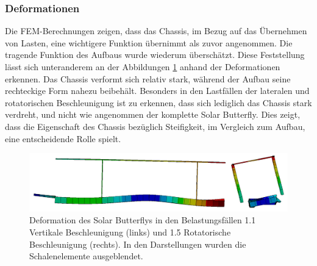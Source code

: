 \subsubsection{Deformationen}
\label{Deformation}
Die FEM-Berechnungen zeigen, dass das Chassis, im Bezug auf das Übernehmen von Lasten, eine wichtigere Funktion übernimmt als zuvor angenommen. Die tragende Funktion des Aufbaus wurde wiederum überschätzt. Diese Feststellung lässt sich unteranderem an der Abbildungen \ref{Def3} anhand der Deformationen erkennen. Das Chassis verformt sich relativ stark, während der Aufbau seine rechteckige Form nahezu beibehält. Besonders in den Lastfällen der lateralen und rotatorischen Beschleunigung ist zu erkennen, dass sich lediglich das Chassis stark verdreht, und nicht wie angenommen der komplette Solar Butterfly. Dies zeigt, dass die Eigenschaft des Chassis bezüglich Steifigkeit, im Vergleich zum Aufbau, eine entscheidende Rolle spielt. \\

\begin{figure}[H]
  \centering
  \includegraphics[width=.98\linewidth]{04_figures/Def3.png}
  \caption{Deformation des Solar Butterflys in den Belastungsfällen 1.1 Vertikale Beschleunigung (links) und 1.5 Rotatorische Beschleunigung (rechts). In den Darstellungen wurden die Schalenelemente ausgeblendet.}
  \label{Def3}
\end{figure}

